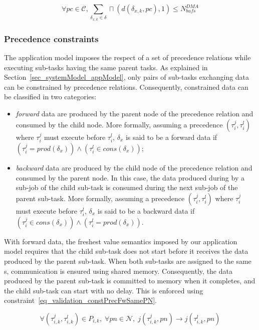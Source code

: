 \documentclass[main.tex]{subfiles}
\begin{document}
\begin{equation}
    \label{eq_validation_consPcUtilDDMA}
    \forall pc \in \mathcal{C} , 
    \sum_{\delta_{x,k} \in \delta} \sqcap ( d(\delta_{x,k} , pc) , 1 ) \leq N_{bufs}^{DMA}
\end{equation}

\subsubsection{Precedence constraints}
The application model imposes the respect of a set of precedence relations while executing sub-tasks having the same parent tasks. As explained in Section~\ref{sec_systemModel_appModel}, only pairs of sub-tasks exchanging data can be constrained by precedence relations. Consequently, constrained data can be classified in two categories:
\begin{itemize}
    \item \emph{forward} data are produced by the parent node of the precedence relation and consumed by the child node. More formally, assuming a precedence $(\tau_i^j , \tau_i^l )$ where $\tau_i^j$ must execute before $\tau_i^l$, $\delta_x$ is said to be a forward data if $(\tau_i^j = prod(\delta_x)) \land (\tau_i^l \in cons(\delta_x))$;
    \item \emph{backward} data are produced by the child node of the precedence relation and consumed by the parent node. In this case, the data produced during by a sub-job of the child sub-task is consumed during the next sub-job of the parent sub-task. More formally, assuming a precedence $(\tau_i^j , \tau_i^l )$ where $\tau_i^j$ must execute before $\tau_i^l$, $\delta_x$ is said to be a backward data if $(\tau_i^j \in cons(\delta_x)) \land (\tau_i^l = prod(\delta_x))$.
\end{itemize}

With forward data, the freshest value semantics imposed by our application model requires that the child sub-task does not start before it receives the data produced by the parent sub-task. When both sub-tasks are assigned to the same \PN{}s, communication is ensured using shared memory. Consequently, the data produced by the parent sub-task is committed to memory when it completes, and the child sub-task can start with no delay. This is enforced using constraint~\ref{eq_validation_constPrecFwSamePN}.

\begin{equation}
    \label{eq_validation_constPrecFwSamePN}
    \forall (\tau_{i,k}^j , \tau_{i,k}^l) \in P_{i,k}, \; \forall pn \in \mathcal{N} , \; 
    j( \tau_{i,k}^j , pn ) \to j( \tau_{i,k}^l , pn )
\end{equation}
\end{document}
